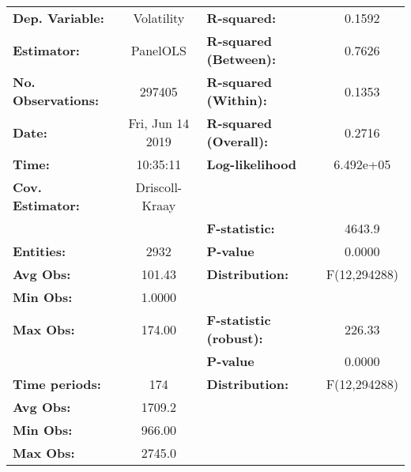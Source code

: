 \begin{center}
\begin{tabular}{lclc}
\toprule
\textbf{Dep. Variable:}                 &     Volatility     & \textbf{  R-squared:         }   &      0.1592      \\
\textbf{Estimator:}                     &      PanelOLS      & \textbf{  R-squared (Between):}  &      0.7626      \\
\textbf{No. Observations:}              &       297405       & \textbf{  R-squared (Within):}   &      0.1353      \\
\textbf{Date:}                          &  Fri, Jun 14 2019  & \textbf{  R-squared (Overall):}  &      0.2716      \\
\textbf{Time:}                          &      10:35:11      & \textbf{  Log-likelihood     }   &    6.492e+05     \\
\textbf{Cov. Estimator:}                &   Driscoll-Kraay   & \textbf{                     }   &                  \\
\textbf{}                               &                    & \textbf{  F-statistic:       }   &      4643.9      \\
\textbf{Entities:}                      &        2932        & \textbf{  P-value            }   &      0.0000      \\
\textbf{Avg Obs:}                       &       101.43       & \textbf{  Distribution:      }   &   F(12,294288)   \\
\textbf{Min Obs:}                       &       1.0000       & \textbf{                     }   &                  \\
\textbf{Max Obs:}                       &       174.00       & \textbf{  F-statistic (robust):} &      226.33      \\
\textbf{}                               &                    & \textbf{  P-value            }   &      0.0000      \\
\textbf{Time periods:}                  &        174         & \textbf{  Distribution:      }   &   F(12,294288)   \\
\textbf{Avg Obs:}                       &       1709.2       & \textbf{                     }   &                  \\
\textbf{Min Obs:}                       &       966.00       & \textbf{                     }   &                  \\
\textbf{Max Obs:}                       &       2745.0       & \textbf{                     }   &                  \\

\end{tabular}
\end{center}

